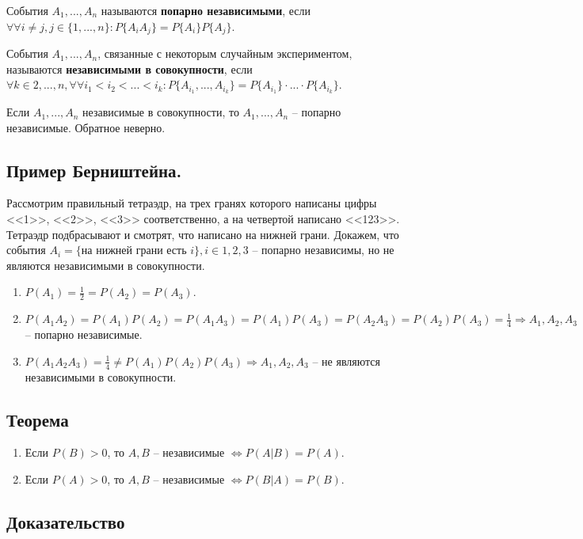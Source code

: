 События $A_1,...,A_n$ называются \textbf{попарно независимыми}, если $\forall\forall i \neq j, j \in \{1, ..., n\}: P\{A_iA_j\} = P\{A_i\}P\{A_j\}$.

События $A_1,...,A_n$, связанные с некоторым случайным экспериментом, называются \textbf{независимыми в совокупности}, если $\forall k \in {2, ..., n}, \forall\forall i_1<i_2<...<i_k: P\{A_{i_1},..., A_{i_k}\} = P\{A_{i_1}\} \cdot ... \cdot P\{A_{i_k}\}$.

Если $A_1, ..., A_n$ независимые в совокупности, то $A_1, ..., A_n$ -- попарно независимые. Обратное неверно.

\subsection*{Пример Берништейна.} Рассмотрим правильный тетраэдр, на трех гранях которого написаны цифры <<1>>, <<2>>, <<3>> соответственно, а на четвертой написано <<123>>. Тетраэдр подбрасывают и смотрят, что написано на нижней грани. Докажем, что события $A_i = \{$на нижней грани есть $i\}, i \in {1, 2, 3}$ -- попарно независимы, но не являются независимыми в совокупности.

\begin{enumerate}
	\item $P(A_1) = \frac{1}{2} = P(A_2) = P(A_3)$.
	\item $P(A_1A_2) = P(A_1)P(A_2) = P(A_1A_3) = P(A_1)P(A_3) = P(A_2A_3) = P(A_2)P(A_3) = \frac{1}{4} \Rightarrow A_1, A_2, A_3$ -- попарно независимые.
	\item $P(A_1A_2A_3) = \frac{1}{4} \neq P(A_1)P(A_2)P(A_3) \Rightarrow A_1, A_2, A_3$ -- не являются независимыми в совокупности.
\end{enumerate}

\subsection*{Теорема}

\begin{enumerate}
	\item Если $P(B) > 0$, то $A, B$ -- независимые $\Leftrightarrow P(A|B) = P(A)$.
	\item Если $P(A) > 0$, то $A, B$ -- независимые $\Leftrightarrow P(B|A) = P(B)$.
\end{enumerate}

\subsection*{Доказательство}

